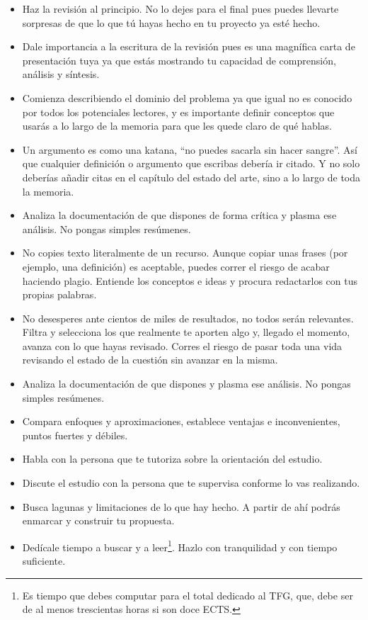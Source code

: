 \begin{itemize}
    \item Haz la revisión al principio. No lo dejes para el final pues puedes llevarte sorpresas de que lo que tú hayas hecho en tu proyecto ya esté hecho.
    \item Dale importancia a la escritura de la revisión pues es una magnífica carta de presentación tuya ya que estás mostrando tu capacidad de comprensión, análisis y síntesis.
    \item Comienza describiendo el dominio del problema ya que igual no es conocido por todos los potenciales lectores, y es importante definir conceptos que usarás a lo largo de la memoria para que les quede claro de qué hablas.
    \item Un argumento es como una katana, ``no puedes sacarla sin hacer sangre''. Así que cualquier definición o argumento que escribas debería ir citado. Y no solo deberías añadir citas en el capítulo del estado del arte, sino a lo largo de toda la memoria.
    \item Analiza la documentación de que dispones de forma crítica y plasma ese análisis. No pongas simples resúmenes.
    \item No copies texto literalmente de un recurso. Aunque copiar unas frases (por ejemplo, una definición) es aceptable, puedes correr el riesgo de acabar haciendo plagio. Entiende los conceptos e ideas y procura redactarlos con tus propias palabras.
    \item No desesperes ante cientos de  miles de resultados, no todos serán relevantes. Filtra y selecciona los que realmente te aporten algo y, llegado el momento, avanza con lo que hayas revisado. Corres el riesgo de pasar toda una vida revisando el estado de la cuestión sin avanzar en la misma.   
    \item Analiza la documentación de que dispones y plasma ese análisis. No pongas simples resúmenes.
    \item Compara enfoques y aproximaciones, establece ventajas e inconvenientes, puntos fuertes y débiles.
    \item Habla con la persona que te tutoriza sobre la orientación del estudio. 
    \item Discute el estudio con la persona que te supervisa conforme lo vas realizando.
    \item Busca lagunas y limitaciones de lo que hay hecho. A partir de ahí podrás enmarcar y construir tu propuesta.
    \item Dedícale tiempo a buscar y a leer\footnote{Es tiempo que debes computar para el total dedicado al TFG, que, debe ser de al menos trescientas horas si son doce ECTS.}. Hazlo con tranquilidad y con tiempo suficiente.  

\end{itemize}
